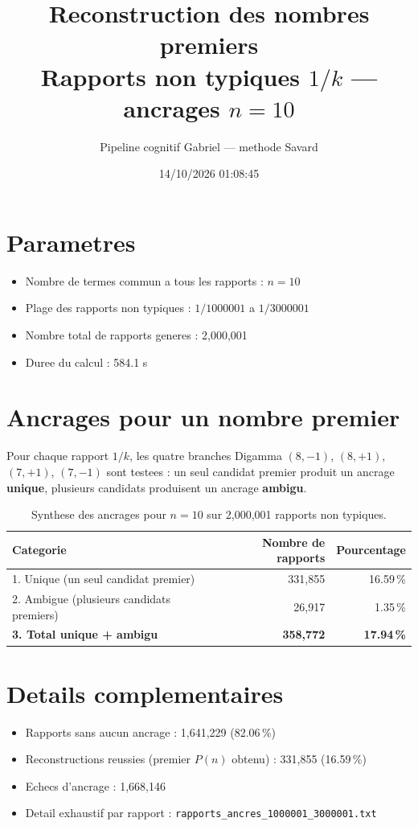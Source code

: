 \documentclass[12pt]{article}
\title{Reconstruction des nombres premiers\\Rapports non typiques $1/k$ --- ancrages $n=10$
}
\author{Pipeline cognitif Gabriel --- methode Savard}
\date{14/10/2026 01:08:45}
\begin{document}
\maketitle

\section*{Parametres}
\begin{itemize}
\item Nombre de termes commun a tous les rapports : $n=10$
\item Plage des rapports non typiques : $1/1000001$ a $1/3000001$
\item Nombre total de rapports generes : 2,000,001
\item Duree du calcul : 584.1 s
\end{itemize}

\section*{Ancrages pour un nombre premier}

Pour chaque rapport $1/k$, les quatre branches Digamma $(8,-1)$, $(8,+1)$, $(7,+1)$, $(7,-1)$ sont testees : un seul candidat premier produit un ancrage \textbf{unique}, plusieurs candidats produisent un ancrage \textbf{ambigu}.

\begin{table}[h!]
\centering
\caption{Synthese des ancrages pour $n=10$ sur 2,000,001 rapports non typiques.}
\begin{tabular}{lrr}
\toprule
\textbf{Categorie} & \textbf{Nombre de rapports} & \textbf{Pourcentage} \\
\midrule
1. Unique (un seul candidat premier) & 331,855 & 16.59\,\% \\
2. Ambigue (plusieurs candidats premiers) & 26,917 & 1.35\,\% \\
\midrule
\textbf{3. Total unique + ambigu} & \textbf{358,772} & \textbf{17.94\,\%} \\
\bottomrule
\end{tabular}
\end{table}

\section*{Details complementaires}
\begin{itemize}
\item Rapports sans aucun ancrage : 1,641,229 (82.06\,\%)
\item Reconstructions reussies (premier $P(n)$ obtenu) : 331,855 (16.59\,\%)
\item Echecs d'ancrage : 1,668,146
\item Detail exhaustif par rapport : \texttt{rapports_ancres_1000001_3000001.txt}
\end{itemize}
\end{document}
